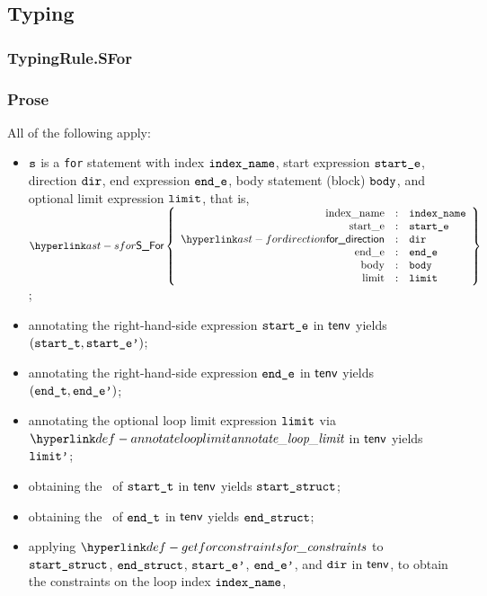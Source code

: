 \subsection{Typing}
\subsubsection{TypingRule.SFor \label{sec:TypingRule.SFor}}
\subsubsection{Prose}
All of the following apply:
\begin{itemize}
  \item $\texttt{s}$ is a \texttt{for} statement with index $\texttt{index\_name}$,
        start expression $\texttt{start\_e}$,
        direction $\texttt{dir}$,
        end expression $\texttt{end\_e}$,
        body statement (block) $\texttt{body}$,
        and optional limit expression $\texttt{limit}$,
        that is, $\SFor\left\{\begin{array}{rcl}
          \Forindexname &:& \vindexname\\
          \Forstarte &:& \vstarte\\
          \fordirection &:& \vdir\\
          \Forende &:& \vende\\
          \Forbody &:& \vbody\\
          \Forlimit &:& \vlimit
        \end{array}\right\}$;
  \item annotating the right-hand-side expression $\texttt{start\_e}$ in $\textsf{tenv}$ yields \\
        $(\texttt{start\_t}, \texttt{start\_e'})$\ProseOrTypeError;
  \item annotating the right-hand-side expression $\texttt{end\_e}$ in $\textsf{tenv}$ yields $(\texttt{end\_t}, \texttt{end\_e'})$\ProseOrTypeError;
  \item annotating the optional loop limit expression $\texttt{limit}$ via $\annotatelooplimit$ in $\textsf{tenv}$
        yields $\texttt{limit'}$\ProseOrTypeError;
  \item obtaining the \underlyingtype\ of $\texttt{start\_t}$ in $\textsf{tenv}$ yields $\texttt{start\_struct}$\ProseOrTypeError;
  \item obtaining the \underlyingtype\ of $\texttt{end\_t}$ in $\textsf{tenv}$ yields $\texttt{end\_struct}$\ProseOrTypeError;
  \item applying $\getforconstraints$ to $\texttt{start\_struct}$, $\texttt{end\_struct}$,
        $\texttt{start\_e'}$, $\texttt{end\_e'}$, and $\texttt{dir}$ in $\textsf{tenv}$,
        to obtain the constraints on the loop index $\texttt{index\_name}$,

\end{itemize}
